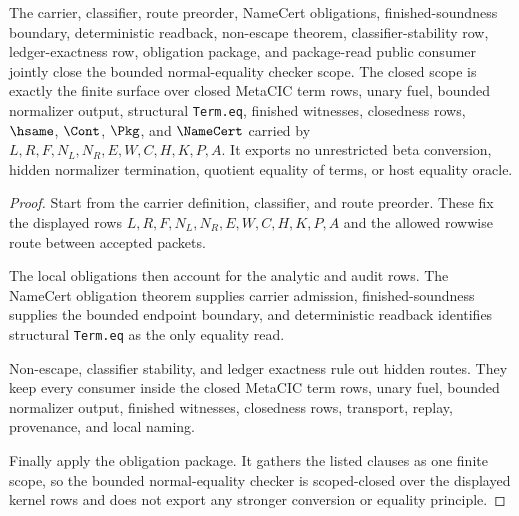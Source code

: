 \begin{theorem}
\label{thm:bounded-normal-equality-checker-scope-closure}
The carrier, classifier, route preorder, NameCert obligations, finished-soundness boundary, deterministic readback, non-escape theorem, classifier-stability row, ledger-exactness row, obligation package, and package-read public consumer jointly close the bounded normal-equality checker scope. The closed scope is exactly the finite surface over closed MetaCIC term rows, unary fuel, bounded normalizer output, structural \texttt{Term.eq}, finished witnesses, closedness rows, $\hsame$, $\Cont$, $\Pkg$, and $\NameCert$ carried by $L,R,F,N_L,N_R,E,W,C,H,K,P,A$. It exports no unrestricted beta conversion, hidden normalizer termination, quotient equality of terms, or host equality oracle.
\end{theorem}
\begin{proof}
Start from the carrier definition, classifier, and route preorder. These fix the displayed rows $L,R,F,N_L,N_R,E,W,C,H,K,P,A$ and the allowed rowwise route between accepted packets.

The local obligations then account for the analytic and audit rows. The NameCert obligation theorem supplies carrier admission, finished-soundness supplies the bounded endpoint boundary, and deterministic readback identifies structural \texttt{Term.eq} as the only equality read.

Non-escape, classifier stability, and ledger exactness rule out hidden routes. They keep every consumer inside the closed MetaCIC term rows, unary fuel, bounded normalizer output, finished witnesses, closedness rows, transport, replay, provenance, and local naming.

Finally apply the obligation package. It gathers the listed clauses as one finite scope, so the bounded normal-equality checker is scoped-closed over the displayed kernel rows and does not export any stronger conversion or equality principle.
\end{proof}

